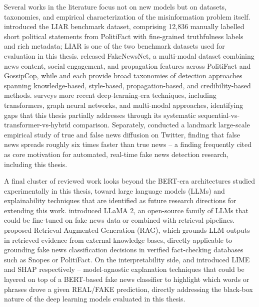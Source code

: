 Several works in the literature focus not on new models but on datasets, taxonomies, and empirical characterization of the misinformation problem itself. \citet{Wang2017Liar} introduced the LIAR benchmark dataset, comprising 12,836 manually labelled short political statements from PolitiFact with fine-grained truthfulness labels and rich metadata; LIAR is one of the two benchmark datasets used for evaluation in this thesis. \citet{Shu2020FakeNewsNet} released FakeNewsNet, a multi-modal dataset combining news content, social engagement, and propagation features across PolitiFact and GossipCop, while \citet{Shu2017FakeNewsDetection} and \citet{Zhou2020Survey} each provide broad taxonomies of detection approaches spanning knowledge-based, style-based, propagation-based, and credibility-based methods. \citet{Mehta2022RecentTrends} surveys more recent deep-learning-era techniques, including transformers, graph neural networks, and multi-modal approaches, identifying gaps that this thesis partially addresses through its systematic sequential-vs-transformer-vs-hybrid comparison. Separately, \citet{Vosoughi2018Spread} conducted a landmark large-scale empirical study of true and false news diffusion on Twitter, finding that false news spreads roughly six times faster than true news -- a finding frequently cited as core motivation for automated, real-time fake news detection research, including this thesis.


A final cluster of reviewed work looks beyond the BERT-era architectures studied experimentally in this thesis, toward large language models (LLMs) and explainability techniques that are identified as future research directions for extending this work. \citet{Touvron2023Llama2} introduced LLaMA 2, an open-source family of LLMs that could be fine-tuned on fake news data or combined with retrieval pipelines. \citet{Lewis2020RAG} proposed Retrieval-Augmented Generation (RAG), which grounds LLM outputs in retrieved evidence from external knowledge bases, directly applicable to grounding fake news classification decisions in verified fact-checking databases such as Snopes or PolitiFact. On the interpretability side, \citet{Ribeiro2016LIME} and \citet{Lundberg2017SHAP} introduced LIME and SHAP respectively -- model-agnostic explanation techniques that could be layered on top of a BERT-based fake news classifier to highlight which words or phrases drove a given REAL/FAKE prediction, directly addressing the black-box nature of the deep learning models evaluated in this thesis.

